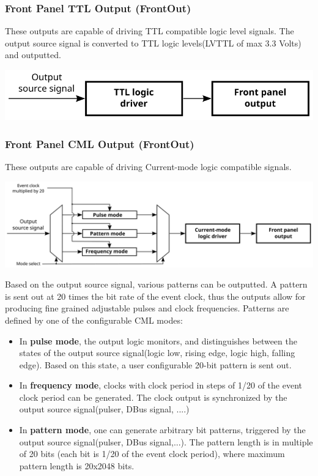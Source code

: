 \documentclass[12pt,a4paper]{article}
\begin{document}
\subsubsection{Front Panel TTL Output (FrontOut)}
These outputs are capable of driving TTL compatible logic level signals. The output source signal is converted to TTL logic levels(LVTTL of max 3.3 Volts) and outputted.

	\includegraphics[]{./img/TTL}

\subsubsection{Front Panel CML Output (FrontOut)}
These outputs are capable of driving Current-mode logic compatible signals. 

	\includegraphics[width=\columnwidth]{./img/CML}


Based on the output source signal, various patterns can be outputted. A pattern is sent out at 20 times the bit rate of the event clock, thus the outputs allow for producing fine grained adjustable pulses and clock frequencies. Patterns are defined by one of the configurable CML modes:
\begin{itemize}
	\item In \textbf{pulse mode}, the output logic monitors, and distinguishes between the states of the output source signal(logic low, rising edge, logic high, falling edge). Based on this state, a user configurable 20-bit pattern is sent out.
	\item In \textbf{frequency mode}, clocks with clock period in steps of 1/20 of the event clock period can be generated. The clock output is synchronized by the output source signal(pulser, DBus signal, ....)
	\item In \textbf{pattern mode}, one can generate arbitrary bit patterns, triggered by the output source signal(pulser, DBus signal,...). The pattern length is in multiple of 20 bits (each bit is 1/20 of the event clock period), where maximum pattern length is 20x2048 bits.
\end{itemize}
\end{document}
